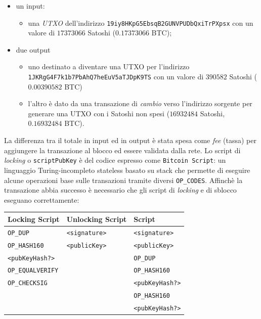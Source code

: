 \begin{itemize}
    \item un input:
        \begin{itemize}
            \item una \textit{UTXO} dell'indirizzo \texttt{19iy8HKpG5EbsqB2GUNVPUDbQxiTrPXpsx} con un valore di $17373066$ Satoshi ($0.17373066$ BTC);
        \end{itemize}
    \item due output
        \begin{itemize}
            \item uno destinato a diventare una UTXO per l'indirizzo\\\texttt{1JKRgG4F7k1b7PbAhQ7heEuV5aTJDpK9TS} con un valore di $390582$ Satoshi ($0.00390582$ BTC)
            \item l'altro è dato da una transazione di \textit{cambio} verso l'indirizzo sorgente per generare una UTXO con i Satoshi non spesi ($16932484$ Satoshi, $0.16932484$ BTC).
        \end{itemize}
\end{itemize}
La differenza tra il totale in input ed in output è stata spesa come \textit{fee} (tassa) per aggiungere la transazione al blocco ed essere validata dalla rete.\newline
Lo script di \textit{locking} o \texttt{scriptPubKey} è del codice espresso come \texttt{Bitcoin~Script}: un linguaggio Turing-incompleto stateless basato su stack che permette di eseguire alcune operazioni base sulle transazioni tramite diversi \texttt{OP\_CODES}.\newline
Affinchè la transazione abbia successo è necessario che gli script di \textit{locking} e di sblocco eseguano correttamente:
\begin{table}[H]
    \centering
    \begin{tabular}{l|l|l}
        Locking Script & Unlocking Script & Script\\
        \hline
        \texttt{OP\_DUP}         & \texttt{<signature>} & \texttt{<signature>}\\
        \texttt{OP\_HASH160}     & \texttt{<publicKey>} & \texttt{<publicKey>}\\
        \texttt{<pubKeyHash?>}   &                      & \texttt{OP\_DUP}\\
        \texttt{OP\_EQUALVERIFY} &                      & \texttt{OP\_HASH160}\\
        \texttt{OP\_CHECKSIG}    &                      & \texttt{<pubKeyHash?>}\\
                                 &                      & \texttt{OP\_HASH160}\\
                                 &                      & \texttt{<pubKeyHash?>}\\
    \end{tabular}
\end{table}
